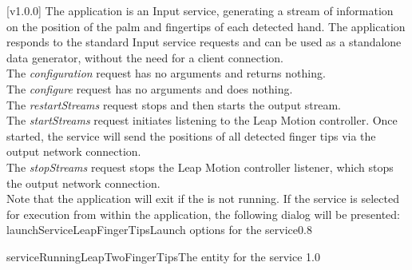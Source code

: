 [v1.0.0]
The  application is an Input service, generating a
stream of information on the position of the palm and fingertips of each detected hand.
The application responds to the standard Input service requests and can be used as a
standalone data generator, without the need for a client connection.\\

The \emph{configuration} request has no arguments and returns nothing.\\

The \emph{configure} request has no arguments and does nothing.\\

The \emph{restartStreams} request stops and then starts the output stream.\\

The \emph{startStreams} request initiates listening to the Leap Motion controller.
Once started, the service will send the positions of all detected finger tips via the
output \yarp{} network connection.\\

The \emph{stopStreams} request stops the Leap Motion controller listener, which stops the
output \yarp{} network connection.\\ 

Note that the application will exit if the \emph{\RS} is not running.
\insertAppParameters
\insertTagDescription{\LFI}
\insertInputServiceComment
\condPage
\insertStandardServiceCommands
\secondaryEnd
\condPage
{}
If the service is selected for execution from within the \emph{\MMMU} application, the
following dialog will be presented:
%
{launchServiceLeapFingerTips}{Launch options for the \emph{\LFI} service}{0.8}

%
{serviceRunningLeapTwoFingerTips}{The \emph{\MMMU} entity for the \emph{\LFI} service}%
{1.0}
\secondaryEnd
\primaryEnd{}

